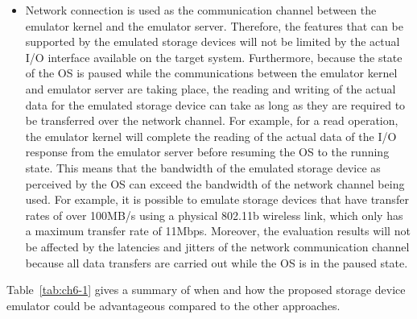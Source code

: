 \begin{itemize}
	\item Network connection is used as the communication channel between the emulator kernel and the emulator server. Therefore, the features that can be supported by the emulated storage devices will not be limited by the actual I/O interface available on the target system. Furthermore, because the state of the OS is paused while the communications between the emulator kernel and emulator server are taking place, the reading and writing of the actual data for the emulated storage device can take as long as they are required to be transferred over the network channel. For example, for a read operation, the emulator kernel will complete the reading of the actual data of the I/O response from the emulator server before resuming the OS to the running state. This means that the bandwidth of the emulated storage device as perceived by the OS can exceed the bandwidth of the network channel being used. For example, it is possible to emulate storage devices that have transfer rates of over 100MB/s using a physical 802.11b wireless link, which only has a maximum transfer rate of 11Mbps. Moreover, the evaluation results will not be affected by the latencies and jitters of the network communication channel because all data transfers are carried out while the OS is in the paused state.
\end{itemize}

Table~\ref{tab:ch6-1} gives a summary of when and how the proposed storage device emulator could be advantageous compared to the other approaches.

